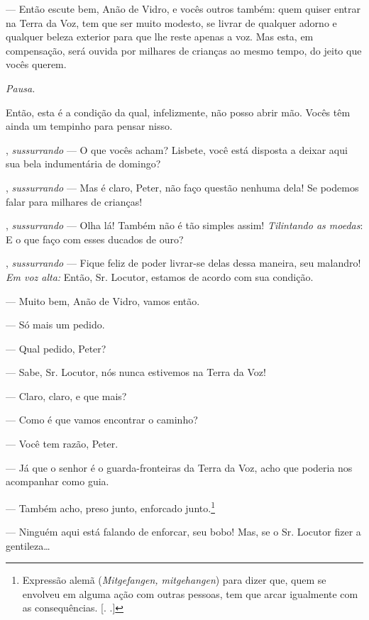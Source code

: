 \begin{myparindent}{0pt}
\begin{Parskip}
 --- Então escute bem, Anão de Vidro, e vocês outros também: quem
quiser entrar na Terra da Voz, tem que ser muito modesto, se livrar de
qualquer adorno e qualquer beleza exterior para que lhe reste apenas a
voz. Mas esta, em compensação, será ouvida por milhares de crianças ao
mesmo tempo, do jeito que vocês querem.

\emph{Pausa.}

Então, esta é a condição da qual, infelizmente, não posso abrir mão.
Vocês têm ainda um tempinho para pensar nisso.

, \emph{sussurrando} --- O que vocês acham? Lisbete,
você está disposta a deixar aqui sua bela indumentária de domingo?

, \emph{sussurrando} --- Mas é claro, Peter, não faço questão
nenhuma dela! Se podemos falar para milhares de crianças!

, \emph{sussurrando} --- Olha lá! Também não é tão simples assim!
\emph{Tilintando as moedas}: E o que faço com esses ducados de ouro?

, \emph{sussurrando} --- Fique feliz de poder livrar-se
delas dessa maneira, seu malandro! \emph{Em voz alta:} Então, Sr.
Locutor, estamos de acordo com sua condição.

 --- Muito bem, Anão de Vidro, vamos então.

 --- Só mais um pedido.

 --- Qual pedido, Peter?

 --- Sabe, Sr. Locutor, nós nunca estivemos na Terra
da Voz!

 --- Claro, claro, e que mais?

 --- Como é que vamos encontrar o caminho?

 --- Você tem razão, Peter.

 --- Já que o senhor é o guarda-fronteiras da Terra
da Voz, acho que poderia nos acompanhar como guia.

 --- Também acho, preso junto, enforcado junto.\footnote{Expressão
  alemã (\emph{Mitgefangen, mitgehangen}) para dizer que, quem se
  envolveu em alguma ação com outras pessoas, tem que arcar igualmente
  com as consequências. [. .]}

 --- Ninguém aqui está falando de enforcar, seu bobo! Mas, se o
Sr. Locutor fizer a gentileza\ldots{}


\end{Parskip}
\end{myparindent}
